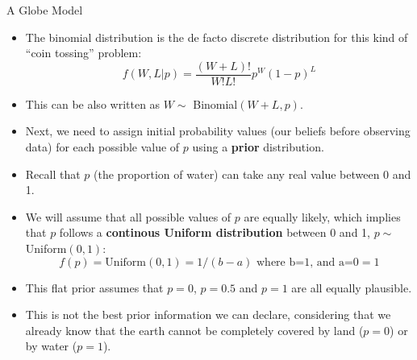 \documentclass[handout]{beamer}
\begin{document}
\begin{frame}{A Globe Model}
\scriptsize{

\begin{itemize}
\item The binomial distribution is the de facto discrete distribution for this kind of ``coin tossing'' problem:
\begin{displaymath}
 f(W,L|p) = \frac{(W+L)!}{W!L!}p^W(1-p)^L
\end{displaymath}

\item This can be also written as $W\sim$ Binomial$(W+L,p)$.

\item Next, we need to assign initial probability values (our beliefs before observing data) for each possible value of $p$ using a \textbf{prior} distribution.
\item Recall that $p$ (the proportion of water) can take any real value between 0 and 1.
\item We will assume that all possible values of $p$ are equally likely, which implies that $p$ follows a \textbf{continous Uniform distribution} between 0 and 1, $p\sim$Uniform$(0,1)$:
\begin{displaymath}
 f(p) = \text{Uniform}(0,1) = 1/(b-a) \text{ where b=1, and a=0} = 1
\end{displaymath}

\item This flat prior assumes that $p=0$, $p=0.5$ and $p=1$ are all equally plausible.
\item This is not the best prior information we can declare, considering that we already know that the earth cannot be completely covered by land ($p=0$) or by water ($p=1$).

\end{itemize}

} 


\end{frame}
\end{document}
